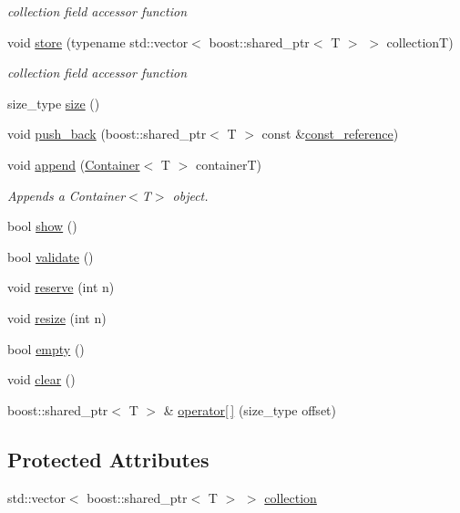 \begin{DoxyCompactItemize}
\begin{DoxyCompactList}\small\item\em collection field accessor function \end{DoxyCompactList}\item 
void \hyperlink{class_container_a601371159ddfee9ab29b676207a0cf75}{store} (typename std::vector$<$ boost::shared\_\-ptr$<$ T $>$ $>$ collectionT)
\begin{DoxyCompactList}\small\item\em collection field accessor function \end{DoxyCompactList}\item 
size\_\-type \hyperlink{class_container_a842c3d9eca81b78b59112fde9707b091}{size} ()
\item 
void \hyperlink{class_container_a1f00050a4bd892699f05f8528afcea2e}{push\_\-back} (boost::shared\_\-ptr$<$ T $>$ const \&\hyperlink{class_container_a9aaab0502055ee85ce5d3633fbca2675}{const\_\-reference})
\item 
void \hyperlink{class_container_a86d42cf807e073724bd2f8e08dcdfefa}{append} (\hyperlink{class_container}{Container}$<$ T $>$ containerT)
\begin{DoxyCompactList}\small\item\em Appends a Container$<$T$>$ object. \end{DoxyCompactList}\item 
bool \hyperlink{class_container_ad72379ee222b073a5eecec7fc1bedfc2}{show} ()
\item 
bool \hyperlink{class_container_aa99a036fd0fe6d6b82ba558157e557d3}{validate} ()
\item 
void \hyperlink{class_container_aa3cbae68ebeed649c52eb3805a30fb75}{reserve} (int n)
\item 
void \hyperlink{class_container_ab77ce6f8173bd47c4cf46643317dffdb}{resize} (int n)
\item 
bool \hyperlink{class_container_ab8e09c25f519687468ef5b9f0fae9b3e}{empty} ()
\item 
void \hyperlink{class_container_aab0690d44c8e04614cea46935ff49e7a}{clear} ()
\item 
boost::shared\_\-ptr$<$ T $>$ \& \hyperlink{class_container_aed3c227120a6a745fa9adfb25c3dd225}{operator\mbox{[}$\,$\mbox{]}} (size\_\-type offset)
\end{DoxyCompactItemize}
\subsection*{Protected Attributes}
\begin{DoxyCompactItemize}
\item 
std::vector$<$ boost::shared\_\-ptr$<$ T $>$ $>$ \hyperlink{class_container_a80e0663ccf6d358b15d0064d855a8e7b}{collection}
\end{DoxyCompactItemize}


